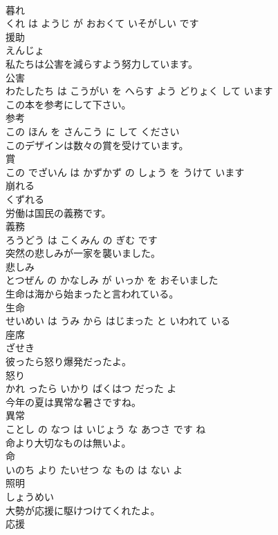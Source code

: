 \documentclass[8pt]{extreport}
\begin{document}
\begin{CJK}{UTF8}{min}
\\	暮れ 
\\	くれ は ようじ が おおくて いそがしい です			
\\	援助	
\\	えんじょ			
\\	私たちは公害を減らすよう努力しています。	
\\	公害 
\\	わたしたち は こうがい を へらす よう どりょく して います			
\\	この本を参考にして下さい。	
\\	参考 
\\	この ほん を さんこう に して ください			
\\	このデザインは数々の賞を受けています。	
\\	賞 
\\	この でざいん は かずかず の しょう を うけて います			
\\	崩れる	
\\	くずれる			
\\	労働は国民の義務です。	
\\	義務 
\\	ろうどう は こくみん の ぎむ です			
\\	突然の悲しみが一家を襲いました。	
\\	悲しみ 
\\	とつぜん の かなしみ が いっか を おそいました			
\\	生命は海から始まったと言われている。	
\\	生命 
\\	せいめい は うみ から はじまった と いわれて いる			
\\	座席	
\\	ざせき			
\\	彼ったら怒り爆発だったよ。	
\\	怒り 
\\	かれ ったら いかり ばくはつ だった よ			
\\	今年の夏は異常な暑さですね。	
\\	異常 
\\	ことし の なつ は いじょう な あつさ です ね			
\\	命より大切なものは無いよ。	
\\	命 
\\	いのち より たいせつ な もの は ない よ			
\\	照明	
\\	しょうめい			
\\	大勢が応援に駆けつけてくれたよ。	
\\	応援 

\end{CJK}
\end{document}
